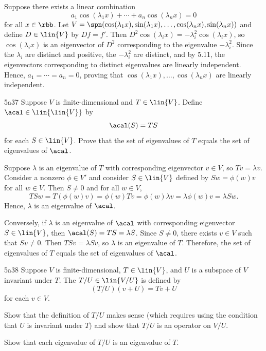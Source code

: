 \begin{sol}
    Suppose there exists a linear combination
    \[
    	a_1 \cos(\lambda_1 x) + \cdots + a_n \cos(\lambda_n x) = 0
    \]
    for all $x \in \rbb$.
	Let $V = \spn(\cos(\lambda_1 x), \sin(\lambda_1 x), \ldots, \cos(\lambda_n x), \sin(\lambda_n x))$ and define $D \in \lin{V}$ by $Df = f'$.
	Then $D^2 \cos(\lambda_i x) = -\lambda_i^2 \cos(\lambda_i x)$, so $\cos(\lambda_i x)$ is an eigenvector of $D^2$ corresponding to the eigenvalue $-\lambda_i^2$.
	Since the $\lambda_i$ are distinct and positive, the $-\lambda_i^2$ are distinct, and by 5.11, the eigenvectors corresponding to distinct eigenvalues are linearly independent.
	Hence, $a_1 = \cdots = a_n = 0$, proving that $\cos(\lambda_1 x), \ldots, \cos(\lambda_n x)$ are linearly independent.
\end{sol}

\begin{exercise}{5a37}
    Suppose $V$ is finite-dimensional and $T \in \lin{V}$.
	Define $\acal \in \lin{\lin{V}}$ by
    \[
    	\acal(S) = TS
    \]
    for each $S \in \lin{V}$.
	Prove that the set of eigenvalues of $T$ equals the set of eigenvalues of $\acal$.
\end{exercise}

\begin{sol}
    Suppose $\lambda$ is an eigenvalue of $T$ with corresponding eigenvector $v \in V$, so $Tv = \lambda v$.
	Consider a nonzero $\phi \in V'$ and consider $S \in \lin{V}$ defined by $Sw = \phi(w)v$ for all $w \in V$.
	Then $S \neq 0$ and for all $w \in V$,
    \[
    	TSw = T(\phi(w)v) = \phi(w)Tv = \phi(w)\lambda v = \lambda \phi(w)v = \lambda Sw.
    \]
    Hence, $\lambda$ is an eigenvalue of $\acal$.
    
    Conversely, if $\lambda$ is an eigenvalue of $\acal$ with corresponding eigenvector $S \in \lin{V}$, then $\acal(S) = TS = \lambda S$.
	Since $S \neq 0$, there exists $v \in V$ such that $Sv \neq 0$.
	Then $TSv = \lambda Sv$, so $\lambda$ is an eigenvalue of $T$.
	Therefore, the set of eigenvalues of $T$ equals the set of eigenvalues of $\acal$.
\end{sol}

\begin{exercise}{5a38}
    Suppose $V$ is finite-dimensional, $T \in \lin{V}$, and $U$ is a subspace of $V$ invariant under $T$.
	The  $T / U \in \lin{V / U}$ is defined by
    \[
    	(T / U)(v + U) = Tv + U
    \]
    for each $v \in V$.
    \begin{subexercises}
        \item Show that the definition of $T / U$ makes sense (which requires using the condition that $U$ is invariant under $T$) and show that $T / U$ is an operator on $V / U$.
        \item Show that each eigenvalue of $T / U$ is an eigenvalue of $T$.
    \end{subexercises}
\end{exercise}

